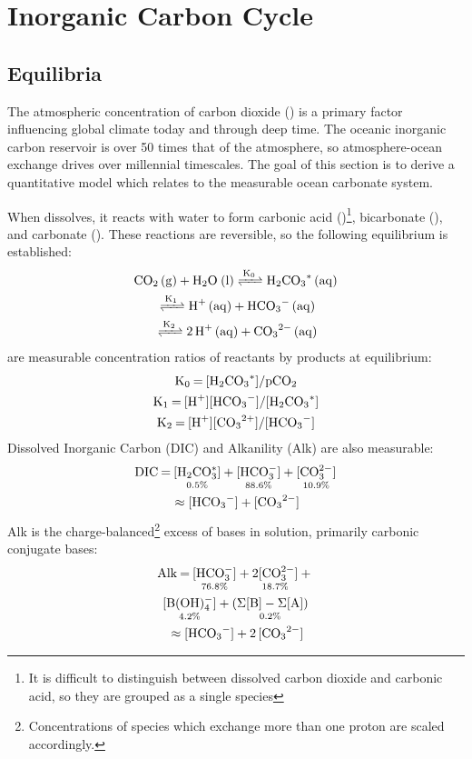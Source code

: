 \chapter{Inorganic Carbon Cycle}\label{carbonate}
\section{Equilibria}
The atmospheric concentration of carbon dioxide () is a primary factor influencing global climate today and through deep time. The oceanic inorganic carbon reservoir is over 50 times that of the atmosphere, so atmosphere-ocean exchange drives  over millennial timescales. The goal of this section is to derive a quantitative model which relates  to the measurable ocean carbonate system.

When  dissolves, it reacts with water to form carbonic acid ()\footnote{It is difficult to distinguish between dissolved carbon dioxide and carbonic acid, so they are grouped as a single species}, bicarbonate (), and carbonate (). These reactions are reversible, so the following equilibrium is established:
\begin{multline}
    \ce{CO2 (g) + H2O (l) <=>[K0] H2CO3^* (aq) \\ <=>[K1] H+ (aq) + HCO3- (aq) \\ <=>[K2] 2H+ (aq) + CO3^2- (aq)}\label{sys}
\end{multline}
 are measurable concentration ratios of reactants by products at equilibrium:
\begin{gather}
    \ce{K0 = [H_2CO_3^{*}]/pCO_2}\label{K0}\\
    \ce{K1 = [H^+][HCO_3^-]/[H_2CO_3^*]}\label{K1}\\
    \ce{K2 = [H^+][CO_3^{2+}]/[HCO_3^-]}\label{K2}
\end{gather}
Dissolved Inorganic Carbon (DIC) and Alkanility (Alk) are also measurable:
\begin{multline}
    \ce{DIC = \underset{0.5\%}{[H_2CO_3^*]} + \underset{88.6\%}{[HCO_3^-]} + \underset{10.9\%}{[CO_3^{2-}]} \\ \approx [HCO3^-] + [CO3^2-]}\label{DICappx}
\end{multline}
Alk is the charge-balanced\footnote{Concentrations of species which exchange more than one proton are scaled accordingly.} excess of bases in solution, primarily carbonic conjugate bases:
\begin{multline}
     \ce{Alk = \underset{76.8\%}{[HCO_3^-]} + \underset{18.7\%}{2[CO_3^{2-}]} + \\ \underset{4.2\%}{[B(OH)_4^-]} + \underset{0.2\%}{(\Sigma[B] - \Sigma[A])} \\
     \approx [HCO3^-] + 2[CO3^2-]\label{alkc}}
\end{multline}
